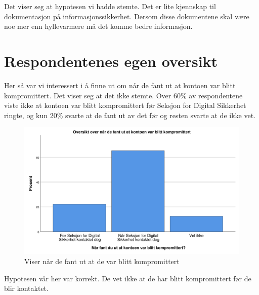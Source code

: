 Det viser seg at hypotesen vi hadde stemte. Det er lite kjennskap til dokumentasjon på informasjonssikkerhet. Dersom disse dokumentene skal være noe mer enn hyllevarmere må det komme bedre informasjon.


\section{Respondentenes egen oversikt}
Her så var vi interessert i å finne ut om når de fant ut at kontoen var blitt kompromittert. Det viser seg at det ikke stemte. Over 60\% av respondentene viste ikke at kontoen var blitt kompromittert før Seksjon for Digital Sikkerhet ringte, og kun 20\% svarte at de fant ut av det før og resten svarte at de ikke vet.
\begin{figure}[H]
    \centering
    \includegraphics[scale=0.5]{case_2/bilder/spss/Fant_ut_kompromittert.pdf}
    \caption[fant-ut-kompromittert]{Viser når de fant ut at de var blitt kompromittert}
    \label{fig:fant-ut-kompromittert}
\end{figure}
Hypotesen vår her var korrekt. De vet ikke at de har blitt kompromittert før de blir kontaktet.


